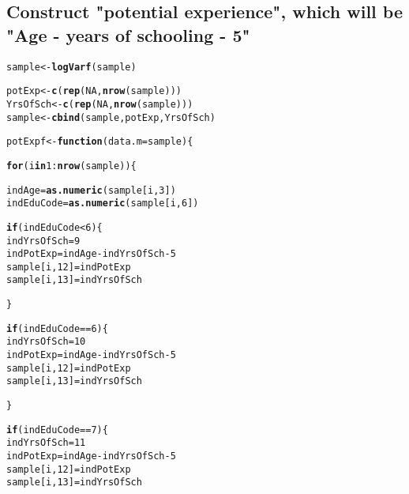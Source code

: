 \documentclass{article}\usepackage[]{graphicx}\usepackage[]{color}
\makeatletter
\newcommand{\hlnum}[1]{\textcolor[rgb]{0.686,0.059,0.569}{#1}}%
\newcommand{\hlopt}[1]{\textcolor[rgb]{0,0,0}{#1}}%
\newcommand{\hlstd}[1]{\textcolor[rgb]{0.345,0.345,0.345}{#1}}%
\newcommand{\hlkwa}[1]{\textcolor[rgb]{0.161,0.373,0.58}{\textbf{#1}}}%
\newcommand{\hlkwb}[1]{\textcolor[rgb]{0.69,0.353,0.396}{#1}}%
\newcommand{\hlkwc}[1]{\textcolor[rgb]{0.333,0.667,0.333}{#1}}%
\newcommand{\hlkwd}[1]{\textcolor[rgb]{0.737,0.353,0.396}{\textbf{#1}}}%
\newenvironment{kframe}{%
 \def\at@end@of@kframe{}%
 \ifinner\ifhmode%
  \def\at@end@of@kframe{\end{minipage}}%
  \begin{minipage}{\columnwidth}%
 \fi\fi%
 \def\FrameCommand##1{\hskip\@totalleftmargin \hskip-\fboxsep
 \colorbox{shadecolor}{##1}\hskip-\fboxsep
     \hskip-\linewidth \hskip-\@totalleftmargin \hskip\columnwidth}%
 \MakeFramed {\advance\hsize-\width
   \@totalleftmargin\z@ \linewidth\hsize
   \@setminipage}}%
 {\par\unskip\endMakeFramed%
 \at@end@of@kframe}
\newenvironment{knitrout}{}{} %
\makeatother
\begin{document}
\subsection{Construct "potential experience", which will be "Age - years of schooling - 5"}

\begin{knitrout}
\color{fgcolor}\begin{kframe}
\begin{alltt}
\hlstd{sample} \hlkwb{<-} \hlkwd{logVarf}\hlstd{(sample)}

\hlstd{potExp} \hlkwb{<-} \hlkwd{c}\hlstd{(}\hlkwd{rep}\hlstd{(}\hlnum{NA}\hlstd{,} \hlkwd{nrow}\hlstd{(sample)))}
\hlstd{YrsOfSch} \hlkwb{<-} \hlkwd{c}\hlstd{(}\hlkwd{rep}\hlstd{(}\hlnum{NA}\hlstd{,} \hlkwd{nrow}\hlstd{(sample)))}
\hlstd{sample} \hlkwb{<-} \hlkwd{cbind}\hlstd{(sample, potExp, YrsOfSch)}

\hlstd{potExpf} \hlkwb{<-} \hlkwa{function}\hlstd{(}\hlkwc{data.m} \hlstd{= sample)\{}

  \hlkwa{for} \hlstd{(i} \hlkwa{in} \hlnum{1}\hlopt{:}\hlkwd{nrow}\hlstd{(sample))\{}

    \hlstd{indAge} \hlkwb{=} \hlkwd{as.numeric}\hlstd{(sample[i,}\hlnum{3}\hlstd{])}
    \hlstd{indEduCode} \hlkwb{=} \hlkwd{as.numeric}\hlstd{(sample[i,}\hlnum{6}\hlstd{])}

    \hlkwa{if} \hlstd{(indEduCode} \hlopt{<} \hlnum{6}\hlstd{)\{}
      \hlstd{indYrsOfSch} \hlkwb{=} \hlnum{9}
      \hlstd{indPotExp} \hlkwb{=} \hlstd{indAge} \hlopt{-} \hlstd{indYrsOfSch} \hlopt{-} \hlnum{5}
      \hlstd{sample[i,}\hlnum{12}\hlstd{]} \hlkwb{=} \hlstd{indPotExp}
      \hlstd{sample[i,}\hlnum{13}\hlstd{]} \hlkwb{=} \hlstd{indYrsOfSch}

    \hlstd{\}}

    \hlkwa{if} \hlstd{(indEduCode} \hlopt{==} \hlnum{6}\hlstd{)\{}
      \hlstd{indYrsOfSch} \hlkwb{=} \hlnum{10}
      \hlstd{indPotExp} \hlkwb{=} \hlstd{indAge} \hlopt{-} \hlstd{indYrsOfSch} \hlopt{-} \hlnum{5}
      \hlstd{sample[i,}\hlnum{12}\hlstd{]} \hlkwb{=} \hlstd{indPotExp}
      \hlstd{sample[i,}\hlnum{13}\hlstd{]} \hlkwb{=} \hlstd{indYrsOfSch}

    \hlstd{\}}

    \hlkwa{if} \hlstd{(indEduCode} \hlopt{==} \hlnum{7}\hlstd{)\{}
      \hlstd{indYrsOfSch} \hlkwb{=} \hlnum{11}
      \hlstd{indPotExp} \hlkwb{=} \hlstd{indAge} \hlopt{-} \hlstd{indYrsOfSch} \hlopt{-} \hlnum{5}
      \hlstd{sample[i,}\hlnum{12}\hlstd{]} \hlkwb{=} \hlstd{indPotExp}
      \hlstd{sample[i,}\hlnum{13}\hlstd{]} \hlkwb{=} \hlstd{indYrsOfSch}


\end{alltt}
\end{kframe}
\end{knitrout}
\end{document}
